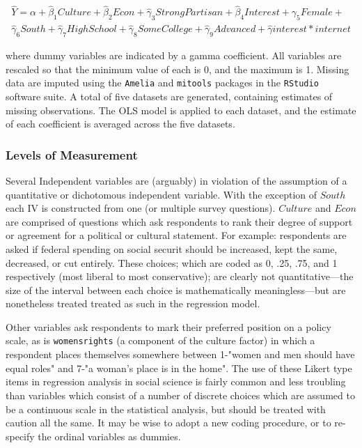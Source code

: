 \documentclass[12pt]{article}
\begin{document}
\begin{equation}
\begin{split}
\hat{Y} = \alpha + \hat{\beta}_1{\mathit{Culture}} + \hat{\beta}_2\mathit{Econ} + \hat{\gamma}_3\mathit{Strong Partisan} +  \hat{\beta}_4\mathit{Interest} +  \gamma_5\mathit{Female} + \\ \hat{\gamma}_6\mathit{South} + \hat{\gamma}_7\mathit{High School} + \hat{\gamma}_8\mathit{Some College} + \hat{\gamma}_9\mathit{Advanced} + \hat{\gamma}\mathit{interest}*\mathit{internet}
\end{split}
\end{equation}

\noindent where dummy variables are indicated by a gamma coefficient. All variables are rescaled so that the minimum value of each is 0, and the maximum is 1. Missing data are imputed using the 
\texttt{Amelia} and \texttt{mitools} packages in the \texttt{RStudio} software suite. A total of five datasets are generated, containing estimates of missing observations. The OLS model is applied to each dataset, and the estimate of each coefficient is averaged across the five datasets.

\subsubsection{Levels of Measurement}

Several Independent variables are (arguably) in violation of the assumption of a quantitative or dichotomous independent variable. With the exception of $\mathit{South}$ each IV is constructed from one (or multiple survey questions). $\mathit{Culture}$ and $\mathit{Econ}$ are comprised of questions which ask respondents to rank their degree of support or agreement  for a political or cultural statement. For example: respondents are asked if federal spending on social securit should be increased, kept the same, decreased, or cut entirely. These choices; which are coded as 0, .25, .75, and 1 respectively (most liberal to most conservative); are clearly not quantitative---the size of the interval between each choice is mathematically meaningless---but are nonetheless treated treated as such in the regression model. 

Other variables ask respondents to mark their preferred position on a policy scale, as is \texttt{womensrights} (a component of the culture factor) in which a respondent places themselves somewhere between 1-"women and men should have equal roles" and 7-"a woman's place is in the home". The use of these Likert type items in regression analysis in social science is fairly common and less troubling than variables which consist of a number of discrete choices which are assumed to be a continuous scale in the statistical analysis, but should be treated with caution all the same. It may be wise to adopt a new coding procedure, or to re-specify the ordinal variables as dummies.
\end{document}
